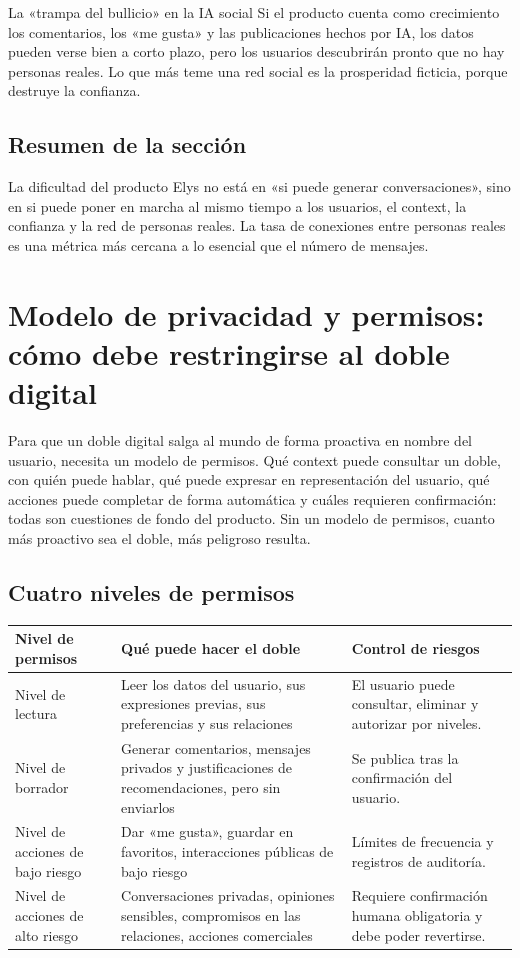 \documentclass[a4paper]{article}
\begin{document}
\begin{warningbox}{La «trampa del bullicio» en la IA social}
Si el producto cuenta como crecimiento los comentarios, los «me gusta» y las publicaciones hechos por IA, los datos pueden verse bien a corto plazo, pero los usuarios descubrirán pronto que no hay personas reales. Lo que más teme una red social es la prosperidad ficticia, porque destruye la confianza.
\end{warningbox}

\subsection{Resumen de la sección}

La dificultad del producto Elys no está en «si puede generar conversaciones», sino en si puede poner en marcha al mismo tiempo a los usuarios, el context, la confianza y la red de personas reales. La tasa de conexiones entre personas reales es una métrica más cercana a lo esencial que el número de mensajes.
\section{Modelo de privacidad y permisos: cómo debe restringirse al doble digital}

Para que un doble digital salga al mundo de forma proactiva en nombre del usuario, necesita un modelo de permisos. Qué context puede consultar un doble, con quién puede hablar, qué puede expresar en representación del usuario, qué acciones puede completar de forma automática y cuáles requieren confirmación: todas son cuestiones de fondo del producto. Sin un modelo de permisos, cuanto más proactivo sea el doble, más peligroso resulta.

\subsection{Cuatro niveles de permisos}

\noindent\begin{tabularx}{\textwidth}{p{}p{}X}
\toprule
Nivel de permisos & Qué puede hacer el doble & Control de riesgos \\
\midrule
Nivel de lectura & Leer los datos del usuario, sus expresiones previas, sus preferencias y sus relaciones & El usuario puede consultar, eliminar y autorizar por niveles. \\
Nivel de borrador & Generar comentarios, mensajes privados y justificaciones de recomendaciones, pero sin enviarlos & Se publica tras la confirmación del usuario. \\
Nivel de acciones de bajo riesgo & Dar «me gusta», guardar en favoritos, interacciones públicas de bajo riesgo & Límites de frecuencia y registros de auditoría. \\
Nivel de acciones de alto riesgo & Conversaciones privadas, opiniones sensibles, compromisos en las relaciones, acciones comerciales & Requiere confirmación humana obligatoria y debe poder revertirse. \\
\bottomrule
\end{tabularx}
\end{document}
